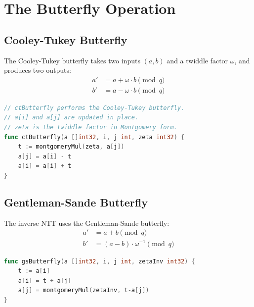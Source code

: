 \section{The Butterfly Operation}


\subsection{Cooley-Tukey Butterfly}

The Cooley-Tukey butterfly takes two inputs $(a, b)$ and a twiddle factor $\omega$, and
produces two outputs:
\begin{align}
a' &= a + \omega \cdot b \pmod{q} \\
b' &= a - \omega \cdot b \pmod{q}
\end{align}

\begin{lstlisting}[language=Go,caption={Cooley-Tukey butterfly in Go}]
// ctButterfly performs the Cooley-Tukey butterfly.
// a[i] and a[j] are updated in place.
// zeta is the twiddle factor in Montgomery form.
func ctButterfly(a []int32, i, j int, zeta int32) {
    t := montgomeryMul(zeta, a[j])
    a[j] = a[i] - t
    a[i] = a[i] + t
}
\end{lstlisting}

\subsection{Gentleman-Sande Butterfly}

The inverse NTT uses the Gentleman-Sande butterfly:
\begin{align}
a' &= a + b \pmod{q} \\
b' &= (a - b) \cdot \omega^{-1} \pmod{q}
\end{align}

\begin{lstlisting}[language=Go,caption={Gentleman-Sande butterfly for INTT}]
func gsButterfly(a []int32, i, j int, zetaInv int32) {
    t := a[i]
    a[i] = t + a[j]
    a[j] = montgomeryMul(zetaInv, t-a[j])
}
\end{lstlisting}

